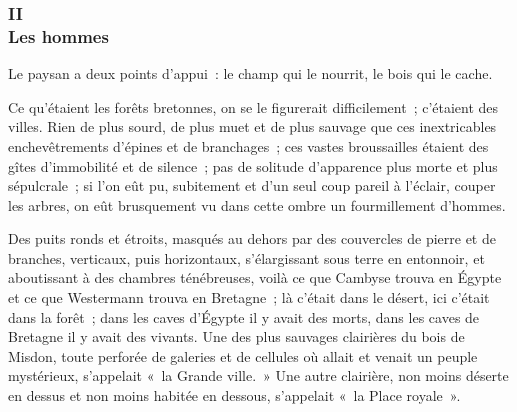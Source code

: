\documentclass[french,twoside]{book} %
\begin{document}
 \subsubsection[{II. Les hommes}]{II \\
Les hommes}
\label{p3l1c2}
\noindent Le paysan a deux points d’appui : le champ qui le nourrit, le bois qui le cache.\par
Ce qu’étaient les forêts bretonnes, on se le figurerait difficilement ; c’étaient des villes. Rien de plus sourd, de plus muet et de plus sauvage que ces inextricables enchevêtrements d’épines et de branchages ; ces vastes broussailles étaient des gîtes d’immobilité et de silence ; pas de solitude d’apparence plus morte et plus sépulcrale ; si l’on eût pu, subitement et d’un seul coup pareil à l’éclair, couper les arbres, on eût brusquement vu dans cette ombre un fourmillement d’hommes.\par
Des puits ronds et étroits, masqués au dehors par des couvercles de pierre et de branches, verticaux, puis horizontaux, s’élargissant sous terre en entonnoir, et aboutissant à des chambres ténébreuses, voilà ce que Cambyse trouva en Égypte et ce que Westermann trouva en Bretagne ; là c’était dans le désert, ici c’était dans la forêt ; dans les caves d’Égypte il y avait des morts, dans les caves de Bretagne il y avait des vivants. Une des plus sauvages clairières du bois de Misdon,  toute perforée de galeries et de cellules où allait et venait un peuple mystérieux, s’appelait « la Grande ville. » Une autre clairière, non moins déserte en dessus et non moins habitée en dessous, s’appelait « la Place royale ».\par
\end{document}
